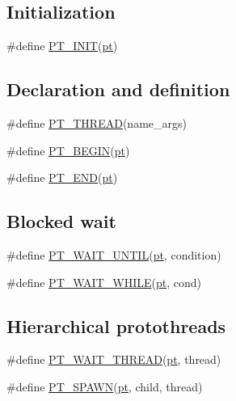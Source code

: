 \subsection*{Initialization}
\label{_amgrp61bcd96a2c1f8026527cbf2019d6e9a4}
 \begin{DoxyCompactItemize}
\item 
\#define \hyperlink{group__pt_gae6bae7dc0225468c8a5ac269df549892}{PT\_\-INIT}(\hyperlink{structpt}{pt})
\end{DoxyCompactItemize}
\subsection*{Declaration and definition}
\label{_amgrpb84d0e8580534792f9b7d25188b8283f}
 \begin{DoxyCompactItemize}
\item 
\#define \hyperlink{group__pt_ga3d4c8bd4aada659eb34f5d2ffd3e7901}{PT\_\-THREAD}(name\_\-args)
\item 
\#define \hyperlink{group__pt_ga2ffbb9e554e08a343ae2f9de4bedfdfc}{PT\_\-BEGIN}(\hyperlink{structpt}{pt})
\item 
\#define \hyperlink{group__pt_ga7b04a0035bef29d905496c23bae066d2}{PT\_\-END}(\hyperlink{structpt}{pt})
\end{DoxyCompactItemize}
\subsection*{Blocked wait}
\label{_amgrp36d09c8907cefca6af853c9b8a5b63aa}
 \begin{DoxyCompactItemize}
\item 
\#define \hyperlink{group__pt_ga99e43010ec61327164466aa2d902de45}{PT\_\-WAIT\_\-UNTIL}(\hyperlink{structpt}{pt}, condition)
\item 
\#define \hyperlink{group__pt_gaad14bbbf092b90aa0a5a4f9169504a8d}{PT\_\-WAIT\_\-WHILE}(\hyperlink{structpt}{pt}, cond)
\end{DoxyCompactItemize}
\subsection*{Hierarchical protothreads}
\label{_amgrp7b94f41b5bf1c373aadc995318c35b63}
 \begin{DoxyCompactItemize}
\item 
\#define \hyperlink{group__pt_ga2f8f70c30b9ee08a103fbd69a4365c4c}{PT\_\-WAIT\_\-THREAD}(\hyperlink{structpt}{pt}, thread)
\item 
\#define \hyperlink{group__pt_ga9e97a0b4d5cc7764d8e19758f5da53ae}{PT\_\-SPAWN}(\hyperlink{structpt}{pt}, child, thread)
\end{DoxyCompactItemize}
